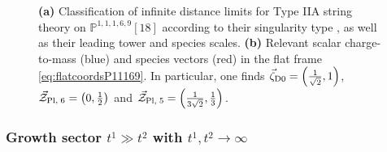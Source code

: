 \begin{figure}[t!]
	\begin{center}
        \quad
		\caption{\small \textbf{(a)} Classification of infinite distance limits for Type IIA string theory on $\mathbb{P}^{1,1,1,6,9}[18]$ according to their singularity type \cite{Corvilain:2018lgw}, as well as their leading tower and species scales. \textbf{(b)} Relevant scalar charge-to-mass (blue) and species vectors (red) in the flat frame \eqref{eq:flatcoordsP11169}. In particular, one finds $\vec{\zeta}_{\rm D0}=\left(\frac{1}{\sqrt{2}},1\right)$, $\vec{\mathcal{Z}}_{\rm Pl,\; 6}=\left(0, \frac{1}{2}\right)$ and $\vec{\mathcal{Z}}_{\rm Pl,\; 5}=\left(\frac{1}{3\sqrt{2}}, \frac{1}{3}\right)$.}
		\label{fig:asympt lim  IIAP11169}
	\end{center}
\end{figure}	
	
	
\subsubsection*{Growth sector $t^1\gg t^2$ with $t^1, t^2 \to \infty$}
	

